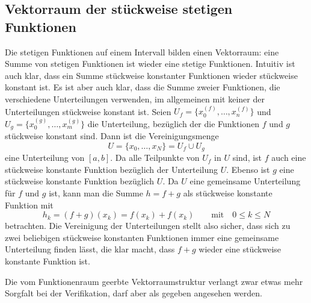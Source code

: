 \subsection{Vektorraum der stückweise stetigen Funktionen}
Die stetigen Funktionen auf einem Intervall bilden einen Vektorraum: eine
Summe von stetigen Funktionen ist wieder eine stetige Funktionen.
Intuitiv ist auch klar, dass ein Summe stückweise konstanter Funktionen
wieder stückweise konstant ist.
Es ist aber auch klar, dass die Summe zweier Funktionen, die verschiedene
Unterteilungen verwenden, im allgemeinen mit keiner der Unterteilungen
stückweise konstant ist.
Seien $U_f=\{x_0^{(f)},\dots,x_n^{(f)}\}$ und
$U_g=\{x_0^{(g)},\dots,x_m^{(g)}\}$ die Unterteilung, bezüglich der 
die Funktionen $f$ und $g$ stückweise konstant sind.
Dann ist die Vereinigungsmenge
\[
U= \{x_0,\dots,x_N\} = U_f\cup U_g
\]
eine Unterteilung von $[a,b]$.
Da alle Teilpunkte von $U_f$ in $U$ sind, ist $f$ auch eine stückweise
konstante Funktion bezüglich der Unterteilung $U$. 
Ebenso ist $g$ eine stückweise konstante Funktion bezüglich $U$.
Da $U$ eine gemeinsame Unterteilung für $f$ und $g$ ist, kann man
die Summe $h=f+g$ als stückweise konstante Funktion mit
\[
h_k
=
(f+g)(x_k)
= 
f(x_k) + f(x_k)
\qquad\text{mit}\quad
0\le k\le N
\]
betrachten.
Die Vereinigung der Unterteilungen stellt also sicher, dass sich
zu zwei beliebigen stückweise konstanten Funktionen immer eine
gemeinsame Unterteilung finden lässt, die klar macht, dass $f+g$
wieder eine stückweise konstante Funktion ist.

Die vom Funktionenraum geerbte Vektorraumstruktur verlangt zwar etwas
mehr Sorgfalt bei der Verifikation, darf aber als gegeben angesehen
werden.

